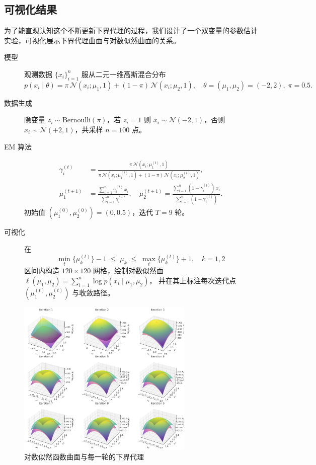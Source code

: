 \documentclass[12pt,a4paper]{article}
\begin{document}
\subsection{可视化结果}
为了能直观认知这个不断更新下界代理的过程，我们设计了一个双变量的参数估计实验，可视化展示下界代理曲面与对数似然曲面的关系。
\begin{description}
  \item[模型] 观测数据 $\{x_i\}_{i=1}^n$ 服从二元一维高斯混合分布
  \[
    p(x_i\mid\theta)
    =\pi\,\mathcal{N}(x_i;\mu_1,1)
    +(1-\pi)\,\mathcal{N}(x_i;\mu_2,1),
    \quad\theta=(\mu_1,\mu_2)=(-2,2),\;\pi=0.5.
  \]
  \item[数据生成] 隐变量 $z_i\sim\mathrm{Bernoulli}(\pi)$，若 $z_i=1$ 则
  $x_i\sim\mathcal{N}(-2,1)$，否则 $x_i\sim\mathcal{N}(+2,1)$，共采样 $n=100$ 点。
  \item[EM 算法]
    \begin{align*}
      \gamma_i^{(t)}
      &=\frac{\pi\,\mathcal{N}(x_i;\mu_1^{(t)},1)}%
               {\pi\,\mathcal{N}(x_i;\mu_1^{(t)},1)
               +(1-\pi)\,\mathcal{N}(x_i;\mu_2^{(t)},1)},\\
      \mu_1^{(t+1)}
      &=\frac{\sum_{i=1}^n\gamma_i^{(t)}\,x_i}{\sum_{i=1}^n\gamma_i^{(t)}},\quad
      \mu_2^{(t+1)}
      =\frac{\sum_{i=1}^n(1-\gamma_i^{(t)})\,x_i}{\sum_{i=1}^n(1-\gamma_i^{(t)})}.
    \end{align*}
    初始值 $(\mu_1^{(0)},\mu_2^{(0)})=(0,0.5)$，迭代 $T=9$ 轮。
  \item[可视化] 在
  \[
    \min_t\{\mu_k^{(t)}\}-1\;\le\;\mu_k\;\le\;\max_t\{\mu_k^{(t)}\}+1,
    \quad k=1,2
  \]
  区间内构造 $120\times120$ 网格，绘制对数似然面
  $\ell(\mu_1,\mu_2)=\sum_{i=1}^n\log p(x_i\mid\mu_1,\mu_2)$，
  并在其上标注每次迭代点 $(\mu_1^{(t)},\mu_2^{(t)})$ 与收敛路径。
\end{description}
\begin{figure}[H]
  \centering
  \includegraphics[width=0.75\textwidth]{../images/output1.png}
  \caption{对数似然函数曲面与每一轮的下界代理}
  \label{fig:low}
\end{figure}
\end{document}
